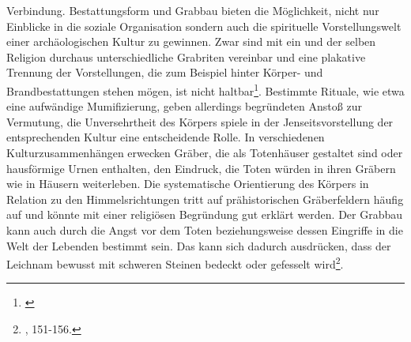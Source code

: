 \documentclass[openany,twoside,twocolumn]{book}
\let\rmarkdownfootnote\footnote%
\def\footnote{\protect\rmarkdownfootnote}
\begin{document}
Verbindung. Bestattungsform und Grabbau bieten die Möglichkeit, nicht
nur Einblicke in die soziale Organisation sondern auch die spirituelle
Vorstellungswelt einer archäologischen Kultur zu gewinnen. Zwar sind mit
ein und der selben Religion durchaus unterschiedliche Grabriten
vereinbar und eine plakative Trennung der Vorstellungen, die zum
Beispiel hinter Körper- und Brandbestattungen stehen mögen, ist nicht
haltbar\footnote{\textcite{portmann_sterben_1993}}. Bestimmte Rituale,
wie etwa eine aufwändige Mumifizierung, geben allerdings begründeten
Anstoß zur Vermutung, die Unversehrtheit des Körpers spiele in der
Jenseitsvorstellung der entsprechenden Kultur eine entscheidende Rolle.
In verschiedenen Kulturzusammenhängen erwecken Gräber, die als
Totenhäuser gestaltet sind oder hausförmige Urnen enthalten, den
Eindruck, die Toten würden in ihren Gräbern wie in Häusern weiterleben.
Die systematische Orientierung des Körpers in Relation zu den
Himmelsrichtungen tritt auf prähistorischen Gräberfeldern häufig auf und
könnte mit einer religiösen Begründung gut erklärt werden. Der Grabbau
kann auch durch die Angst vor dem Toten beziehungsweise dessen Eingriffe
in die Welt der Lebenden bestimmt sein. Das kann sich dadurch
ausdrücken, dass der Leichnam bewusst mit schweren Steinen bedeckt oder
gefesselt wird\footnote{\textcite{hofmann_rituelle_2008}, 151-156.}.
\end{document}
